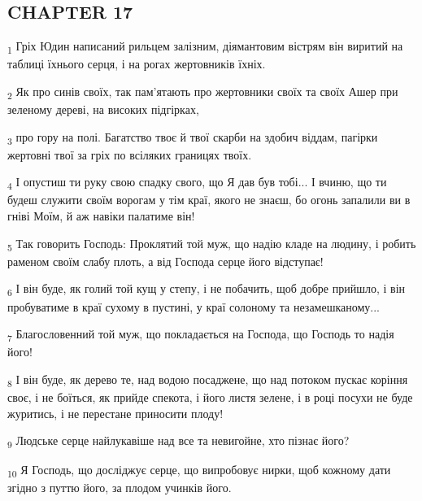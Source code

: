 \subsection{CHAPTER 17}
\begin{tcolorbox}
\textsubscript{1} Гріх Юдин написаний рильцем залізним, діямантовим вістрям він виритий на таблиці їхнього серця, і на рогах жертовників їхніх.
\end{tcolorbox}
\begin{tcolorbox}
\textsubscript{2} Як про синів своїх, так пам'ятають про жертовники своїх та своїх Ашер при зеленому дереві, на високих підгірках,
\end{tcolorbox}
\begin{tcolorbox}
\textsubscript{3} про гору на полі. Багатство твоє й твої скарби на здобич віддам, пагірки жертовні твої за гріх по всіляких границях твоїх.
\end{tcolorbox}
\begin{tcolorbox}
\textsubscript{4} І опустиш ти руку свою спадку свого, що Я дав був тобі... І вчиню, що ти будеш служити своїм ворогам у тім краї, якого не знаєш, бо огонь запалили ви в гніві Моїм, й аж навіки палатиме він!
\end{tcolorbox}
\begin{tcolorbox}
\textsubscript{5} Так говорить Господь: Проклятий той муж, що надію кладе на людину, і робить раменом своїм слабу плоть, а від Господа серце його відступає!
\end{tcolorbox}
\begin{tcolorbox}
\textsubscript{6} І він буде, як голий той кущ у степу, і не побачить, щоб добре прийшло, і він пробуватиме в краї сухому в пустині, у краї солоному та незамешканому...
\end{tcolorbox}
\begin{tcolorbox}
\textsubscript{7} Благословенний той муж, що покладається на Господа, що Господь то надія його!
\end{tcolorbox}
\begin{tcolorbox}
\textsubscript{8} І він буде, як дерево те, над водою посаджене, що над потоком пускає коріння своє, і не боїться, як прийде спекота, і його листя зелене, і в році посухи не буде журитись, і не перестане приносити плоду!
\end{tcolorbox}
\begin{tcolorbox}
\textsubscript{9} Людське серце найлукавіше над все та невигойне, хто пізнає його?
\end{tcolorbox}
\begin{tcolorbox}
\textsubscript{10} Я Господь, що досліджує серце, що випробовує нирки, щоб кожному дати згідно з путтю його, за плодом учинків його.
\end{tcolorbox}
